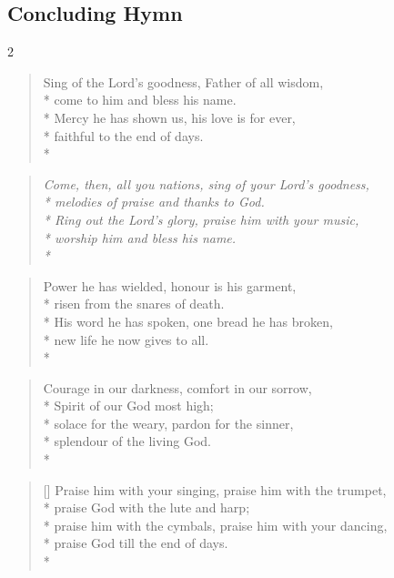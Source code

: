 \documentclass[12pt]{article}
\newcounter{count}
\newcommand\printcount{\addtocounter{count}{1}\thecount}
\begin{document}
\begin{center}
\subsection*{Concluding Hymn}
\end{center}
\begin{multicols}{2}
\setcounter{count}{0}
\begin{verse}
\flagverse{\printcount.} Sing of the Lord's goodness, Father of all wisdom,\\*
come to him and bless his name.\\*
Mercy he has shown us, his love is for ever,\\*
faithful to the end of days.\\*
\end{verse}

\begin{verse}
\textit{Come, then, all you nations, sing of your Lord's goodness,\\*
melodies of praise and thanks to God.\\*
Ring out the Lord's glory, praise him with your music,\\*
worship him and bless his name.\\*}
\end{verse}

\begin{verse}
\flagverse{\printcount.} Power he has wielded, honour is his garment,\\*
risen from the snares of death.\\*
His word he has spoken, one bread he has broken,\\*
new life he now gives to all.\\*
\end{verse}

\begin{verse}
\flagverse{\printcount.} Courage in our darkness, comfort in our sorrow,\\*
Spirit of our God most high;\\*
solace for the weary, pardon for the sinner,\\*
splendour of the living God.\\*
\end{verse}
\end{multicols}

\settowidth{\versewidth}{Praise him with your singing, praise him with the trumpet,}
\begin{verse}[\versewidth]
\flagverse{\printcount.} Praise him with your singing, praise him with the trumpet,\\*
praise God with the lute and harp;\\*
praise him with the cymbals, praise him with your dancing,\\*
praise God till the end of days.\\*
\end{verse}
\end{document}
